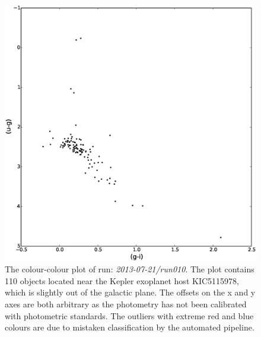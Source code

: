 \begin{figure}
\centering
\includegraphics[width=120mm]{images/2013-07-21-run010-2colour.eps}
\caption{The colour-colour plot of run: \emph{2013-07-21/run010}. The plot contains 110 objects located near the Kepler exoplanet host KIC5115978, which is slightly out of the galactic plane. The offsets on the x and y axes are both arbitrary as the photometry has not been calibrated with photometric standards. The outliers with extreme red and blue colours are due to mistaken classification by the automated pipeline. }
\label{fig:run010-2colour}
\end{figure}

